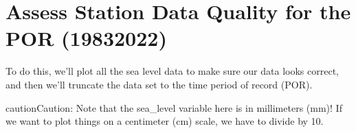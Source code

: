 \documentclass[letterpaper,10pt,english]{jupyterBook}
\begin{document}
\section{Assess Station Data Quality for the POR (1983\sphinxhyphen{}2022)}
\label{\detokenize{notebooks/FloodFrequency:assess-station-data-quality-for-the-por-1983-2022}}
\sphinxAtStartPar
To do this, we’ll plot all the sea level data to make sure our data looks correct, and then we’ll truncate the data set to the time period of record (POR).

\begin{sphinxShadowBox}

\begin{sphinxadmonition}{caution}{Caution:}
\sphinxAtStartPar
Note that the sea\_level variable here is in millimeters (mm)! If we want to plot things on a centimeter (cm) scale, we have to divide by 10.
\end{sphinxadmonition}
\end{sphinxShadowBox}
\end{document}
